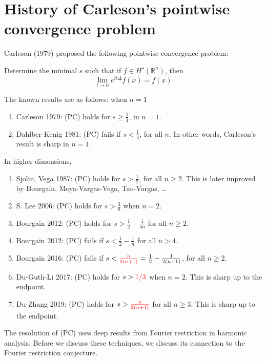 \documentclass[openany]{book}
\newcommand{\R}{\mathbb{R}}
\begin{document}
\section{History of Carleson's pointwise convergence problem}
Carleson (1979) proposed the following pointwise convergence problem:
\begin{prob}[Carleson, 1979]
    Determine the minimal $s$ such that if $f\in H^s(\R^n)$, then 
    \begin{equation}\label{PC}
        \lim_{t\to 0}e^{it\Delta}f(x)=f(x) \tag{PC}
    \end{equation}
\end{prob}
The known results are as follows: when $n=1$
\begin{enumerate}
    \item Carleson 1979: (PC) holds for $s\geq\frac{1}{4}$, in $n=1$.
    \item Dahlber-Kenig 1981: (PC) fails if $s<\frac{1}{4}$, for all $n$. In other words, Carleson's result is sharp in $n=1$.
\end{enumerate}
In higher dimensions,
\begin{enumerate}
    \item Sjolin, Vega 1987: (PC) holds for $s>\frac{1}{2}$, for all $n\geq 2$. This is later improved by Bourgain, Moya-Vargas-Vega, Tao-Vargas, \dots
    \item S. Lee 2006: (PC) holds for $s>\frac{3}{8}$ when $n=2$.
    \item Bourgain 2012: (PC) holds for $s>\frac{1}{2}-\frac{1}{4n}$ for all $n\geq 2$.
    \item Bourgain 2012: (PC) fails if $s<\frac{1}{2}-\frac{1}{n}$ for all $n>4$. 
    \item Bourgain 2016: (PC) fails if $s<\textcolor{red}{\frac{n}{2(n+1)}}=\frac{1}{2}-\frac{1}{2(n+1)}$, for all $n\geq 2$. 
    \item Du-Guth-Li 2017: (PC) holds for $s>\textcolor{red}{1/3}$ when $n=2$. This is sharp up to the endpoint.
    \item Du-Zhang 2019: (PC) holds for $s>\textcolor{red}{\frac{n}{2(n+1)}}$ for all $n\geq 3$. This is sharp up to the endpoint.
\end{enumerate}
The resolution of (PC) uses deep results from Fourier restriction in harmonic analysis. Before we discuss these techniques, we discuss its connection to the Fourier restriction conjecture.
\end{document}
